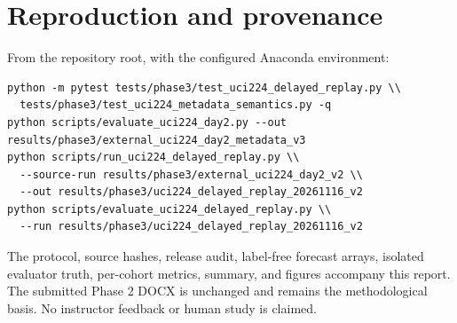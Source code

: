 \documentclass[10pt,a4paper]{article}
\begin{document}
\section*{Reproduction and provenance}
From the repository root, with the configured Anaconda environment:
\begin{verbatim}
python -m pytest tests/phase3/test_uci224_delayed_replay.py \\
  tests/phase3/test_uci224_metadata_semantics.py -q
python scripts/evaluate_uci224_day2.py --out results/phase3/external_uci224_day2_metadata_v3
python scripts/run_uci224_delayed_replay.py \\
  --source-run results/phase3/external_uci224_day2_v2 \\
  --out results/phase3/uci224_delayed_replay_20261116_v2
python scripts/evaluate_uci224_delayed_replay.py \\
  --run results/phase3/uci224_delayed_replay_20261116_v2
\end{verbatim}
The protocol, source hashes, release audit, label-free forecast arrays, isolated evaluator truth, per-cohort metrics, summary, and figures accompany this report. The submitted Phase 2 DOCX is unchanged and remains the methodological basis. No instructor feedback or human study is claimed.
\end{document}
